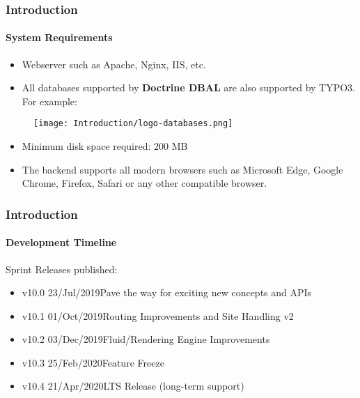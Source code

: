 
\begin{frame}[fragile]
	\frametitle{Introduction}
	\framesubtitle{System Requirements}

	\begin{itemize}
		\item Webserver such as Apache, Nginx, IIS, etc.
		\item All databases supported by \textbf{Doctrine DBAL} are also
			supported by TYPO3. For example:
	\end{itemize}

	\begin{figure}
		\texttt{[image: Introduction/logo-databases.png]}
	\end{figure}

	\begin{itemize}
		\item Minimum disk space required: 200 MB
		\item The backend supports all modern browsers such as Microsoft Edge,
			Google Chrome, Firefox, Safari or any other compatible browser.
	\end{itemize}

\end{frame}


\begin{frame}[fragile]
	\frametitle{Introduction}
	\framesubtitle{Development Timeline}

	Sprint Releases published:
	\vspace{0.4cm}
	\begin{itemize}
		\item v10.0 \tabto{1.1cm}23/Jul/2019\tabto{3.4cm}Pave the way for exciting new concepts and APIs
		\item v10.1 \tabto{1.1cm}01/Oct/2019\tabto{3.4cm}Routing Improvements and Site Handling v2
		\item v10.2 \tabto{1.1cm}03/Dec/2019\tabto{3.4cm}Fluid/Rendering Engine Improvements
		\item v10.3 \tabto{1.1cm}25/Feb/2020\tabto{3.4cm}Feature Freeze
		\item v10.4 \tabto{1.1cm}21/Apr/2020\tabto{3.4cm}LTS Release (long-term support)
	\end{itemize}

\end{frame}

